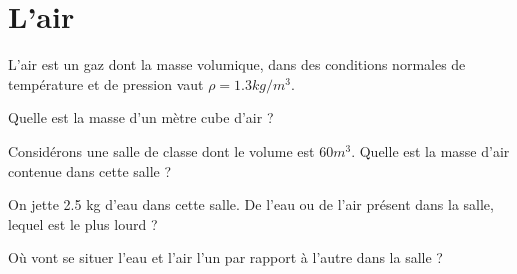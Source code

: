 \section{L'air}

L'air est un gaz dont la masse volumique, dans des conditions normales de température et de pression vaut $\rho = \num{1.3} kg/m^3$.

\begin{questions}
	\question Quelle est la masse d'un mètre cube d'air ?
	\fillwithdottedlines{2cm}
	
	\question Considérons une salle de classe dont le volume est $60 m^3$. Quelle est la masse d'air contenue dans cette salle ?
	\fillwithdottedlines{2cm}
	
	\question On jette \num{2.5} kg d'eau dans cette salle. De l'eau ou de l'air présent dans la salle, lequel est le plus lourd ?
	\fillwithdottedlines{2cm}
	
	\question Où vont se situer l'eau et l'air l'un par rapport à l'autre dans la salle ?
	\fillwithdottedlines{2cm}
		
		
\end{questions}